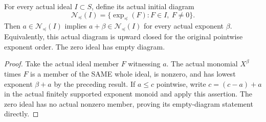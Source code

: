 \begin{theorem}
\label{hir:actual-formal-ideal-initial-diagram-upper}
For every actual ideal $I\subset S$, define its actual initial diagram
\[
 \mathcal N_\preceq(I)=
 \{\exp_\preceq(F):F\in I,\ F\ne0\}.
\]
Then $a\in\mathcal N_\preceq(I)$ implies
$a+\beta\in\mathcal N_\preceq(I)$ for every actual exponent $\beta$.
Equivalently, this actual diagram is upward closed for the original
pointwise exponent order. The zero ideal has empty diagram.
\leanok
\end{theorem}
\begin{proof}
Take the actual ideal member $F$ witnessing $a$. The actual monomial
$X^\beta$ times $F$ is a member of the SAME whole ideal, is nonzero,
and has lowest exponent $\beta+a$ by the preceding result. If $a\le c$
pointwise, write $c=(c-a)+a$ in the actual finitely supported exponent
monoid and apply this assertion. The zero ideal has no actual nonzero
member, proving its empty-diagram statement directly.
\end{proof}

